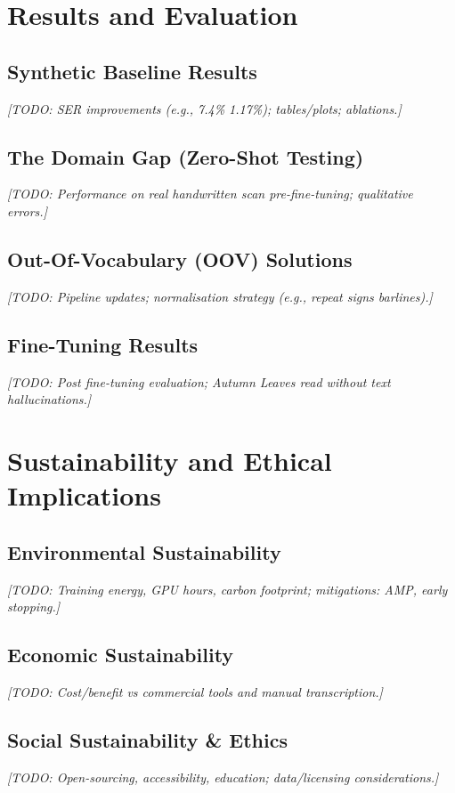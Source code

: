 \documentclass[11pt, a4paper]{report}
\begin{document}
\chapter{Results and Evaluation}
\label{ch:results}
\section{Synthetic Baseline Results}
\textit{[TODO: SER improvements (e.g., 7.4\% \textrightarrow{} 1.17\%); tables/plots; ablations.]}

\section{The Domain Gap (Zero-Shot Testing)}
\textit{[TODO: Performance on real handwritten scan pre-fine-tuning; qualitative errors.]}

\section{Out-Of-Vocabulary (OOV) Solutions}
\textit{[TODO: Pipeline updates; normalisation strategy (e.g., repeat signs \textrightarrow{} barlines).]}

\section{Fine-Tuning Results}
\textit{[TODO: Post fine-tuning evaluation; Autumn Leaves read without text hallucinations.]}


\chapter{Sustainability and Ethical Implications}
\label{ch:sustain}
\section{Environmental Sustainability}
\textit{[TODO: Training energy, GPU hours, carbon footprint; mitigations: AMP, early stopping.]}

\section{Economic Sustainability}
\textit{[TODO: Cost/benefit vs commercial tools and manual transcription.]}

\section{Social Sustainability \& Ethics}
\textit{[TODO: Open-sourcing, accessibility, education; data/licensing considerations.]}
\end{document}
